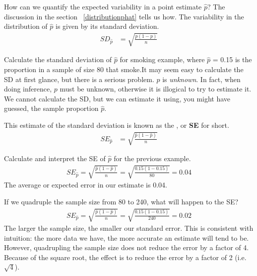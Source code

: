 How can we quantify the expected variability in a point estimate $\hat{p}$?  The discussion in the section ~\ref{distributionphat} tells us how.  The variability in the distribution of $\hat{p}$ is given by its standard deviation.  
\begin{align*}
SD_{\hat{p}}&=\sqrt{\frac{p(1-p)}{n}}
\end{align*}

\begin{example}{Calculate the standard deviation of $\hat{p}$ for smoking example, where $\hat{p}$ = 0.15 is the proportion in a sample of size 80 that smoke.}It may seem easy to calculate the SD at first glance, but there is a serious problem.  $p$ is \emph{unknown}.  In fact, when doing inference, $p$ must be unknown, otherwise it is illogical to try to estimate it.  We cannot calculate the SD, but we can estimate it using, you might have guessed, the sample proportion $\hat{p}$.  
\end{example}
 
This estimate of the standard deviation is known as the , or \textbf{SE} for short.
\begin{align*}
SE_{\hat{p}}&=\sqrt{\frac{\hat{p}(1-\hat{p})}{n}}
\end{align*}

\begin{example}{Calculate and interpret the SE of $\hat{p}$ for the previous example.}
\begin{align*}
SE_{\hat{p}}=\sqrt{\frac{\hat{p}(1-\hat{p})}{n}} =\sqrt{\frac{0.15(1-0.15)}{80}}=0.04
\end{align*}
The average or expected error in our estimate is 0.04.
\end{example}

\begin{example}{If we quadruple the sample size from 80 to 240, what will happen to the SE?}
\begin{align*}
SE_{\hat{p}}=\sqrt{\frac{\hat{p}(1-\hat{p})}{n}} =\sqrt{\frac{0.15(1-0.15)}{240}}=0.02
\end{align*}
The larger the sample size, the smaller our standard error.  This is consistent with intuition: the more data we have, the more accurate an estimate will tend to be.  However, quadrupling the sample size does not reduce the error by a factor of 4.  Because of the square root, the effect is to reduce the error by a factor of 2 (i.e. $\sqrt{4}$). 
\end{example}

